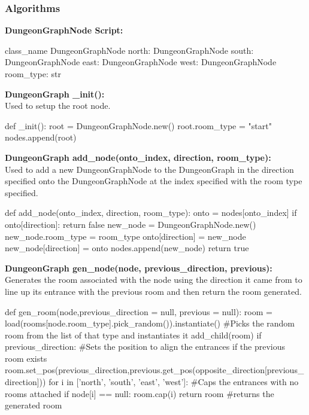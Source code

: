 \documentclass{article}
\begin{document}
        \subsubsection{Algorithms}
        \textbf{DungeonGraphNode Script:}\\
        \begin{python}
class_name DungeonGraphNode
north: DungeonGraphNode
south: DungeonGraphNode
east: DungeonGraphNode
west: DungeonGraphNode
room_type: str
        \end{python}
        \textbf{DungeonGraph \_init():}\\
        Used to setup the root node.
        \begin{python}
def _init():
   root = DungeonGraphNode.new()
   root.room_type = "start"
   nodes.append(root)
        \end{python}
        \textbf{DungeonGraph add\_node(onto\_index, direction, room\_type):}\\
        Used to add a new DungeonGraphNode to the DungeonGraph in the direction specified onto the DungeonGraphNode at the index specified with the room type specified.\\
        \begin{python}
def add_node(onto_index, direction, room_type):
   onto = nodes[onto_index]
   if onto[direction]:
      return false
   new_node = DungeonGraphNode.new()
   new_node.room_type = room_type
   onto[direction] = new_node
   new_node[direction] = onto
   nodes.append(new_node)
   return true
        \end{python}
        \textbf{DungeonGraph gen\_node(node, previous\_direction, previous):}\\
        Generates the room associated with the node using the direction it came from to line up its entrance with the previous room and then return the room generated.\\
        \begin{python}
def gen_room(node,previous_direction = null, previous = null):
   room = load(rooms[node.room_type].pick_random()).instantiate() #Picks the random room from the list of that type and instantiates it
   add_child(room)
   if previous_direction: #Sets the position to align the entrances if the previous room exists
      room.set_pos(previous_direction,previous.get_pos(opposite_direction[previous_direction]))
   for i in ['north', 'south', 'east', 'west']: #Caps the entrances with no rooms attached
      if node[i] == null:
         room.cap(i)
   return room #returns the generated room
        \end{python}
\end{document}
